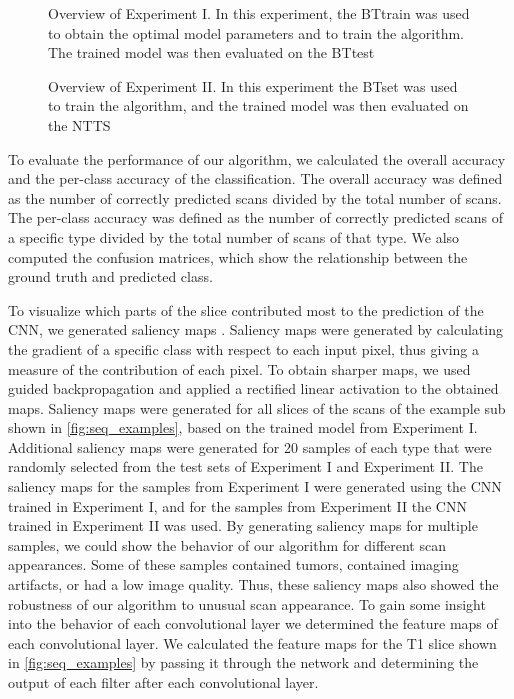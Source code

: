 \begin{figure}
\centering
{}
\caption{Overview of Experiment I\@. In this experiment, the \gls{BTtrain} was used to obtain the optimal model parameters and to train the algorithm. The trained model was then evaluated on the \gls{BTtest}}\label{fig:brain_tumor_experiment}
\end{figure}

\begin{figure}
\centering


\caption{Overview of Experiment II\@. In this experiment the \gls{BTset} was used to train the algorithm, and the trained model was then evaluated on the \gls{NTTS}}\label{fig:adni_experiment}
\end{figure}

To evaluate the performance of our algorithm, we calculated the overall accuracy and the per-class accuracy of the classification.
The overall accuracy was defined as the number of correctly predicted \glspl{scan} divided by the total number of \glspl{scan}.
The per-class accuracy was defined as the number of correctly predicted \glspl{scan} of a specific \gls{type} divided by the total number of \glspl{scan} of that \gls{type}.
We also computed the confusion matrices, which show the relationship between the ground truth and predicted \gls{class}.

To visualize which parts of the \gls{slice} contributed most to the prediction of the \gls{CNN}, we generated saliency maps \autocite{simonyan2014deep}.
Saliency maps were generated by calculating the gradient of a specific \gls{class} with respect to each input pixel, thus giving a measure of the contribution of each pixel.
To obtain sharper maps, we used guided backpropagation \autocite{springenberg2015striving} and applied a rectified linear activation to the obtained maps.
Saliency maps were generated for all \glspl{slice} of the \glspl{scan} of the example \gls{sub} shown in \cref{fig:seq_examples}, based on the trained model from Experiment I.
Additional saliency maps were generated for 20 \glspl{sample} of each \gls{type} that were randomly selected from the test sets of Experiment I and Experiment II\@.
The saliency maps for the \glspl{sample} from Experiment I were generated using the \gls{CNN} trained in Experiment I, and for the \glspl{sample} from Experiment II the \gls{CNN} trained in Experiment II was used.
By generating saliency maps for multiple \glspl{sample}, we could show the behavior of our algorithm for different \gls{scan} appearances.
Some of these \glspl{sample} contained \glspl{tumor}, contained imaging artifacts, or had a low image quality.
Thus, these saliency maps also showed the robustness of our algorithm to unusual \gls{scan} appearance.
To gain some insight into the behavior of each convolutional layer we determined the feature maps of each convolutional layer.
We calculated the feature maps for the \gls{T1} \gls{slice} shown in \cref{fig:seq_examples} by passing it through the network and determining the output of each filter after each convolutional layer.


